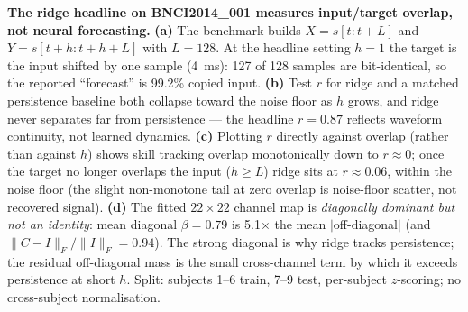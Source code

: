 \caption{\textbf{The ridge headline on BNCI2014\_001 measures input/target overlap, not
neural forecasting.} \textbf{(a)} The benchmark builds $X=s[t{:}t{+}L]$ and $Y=s[t{+}h{:}t{+}h{+}L]$
with $L{=}128$. At the headline setting $h{=}1$ the target is the input shifted by one sample
(4~ms): 127 of 128 samples are bit-identical, so the reported ``forecast'' is
99.2\% copied input. \textbf{(b)} Test $r$ for ridge and a matched persistence baseline
both collapse toward the noise floor as $h$ grows, and ridge never separates far from
persistence --- the headline $r{=}0.87$ reflects waveform continuity, not learned dynamics.
\textbf{(c)} Plotting $r$ directly against overlap (rather than against $h$) shows skill tracking
overlap monotonically down to $r\approx0$; once the target no longer overlaps the input
($h\ge L$) ridge sits at $r\approx0.06$, within the noise floor (the slight non-monotone
tail at zero overlap is noise-floor scatter, not recovered signal). \textbf{(d)} The fitted $22\times22$ channel map is
\emph{diagonally dominant but not an identity}: mean diagonal $\beta{=}0.79$ is
5.1$\times$ the mean $|$off-diagonal$|$ (and $\|C-I\|_F/\|I\|_F{=}0.94$). The strong
diagonal is why ridge tracks persistence; the residual off-diagonal mass is the small
cross-channel term by which it exceeds persistence at short $h$. Split: subjects 1--6 train,
7--9 test, per-subject $z$-scoring; no cross-subject normalisation.}
